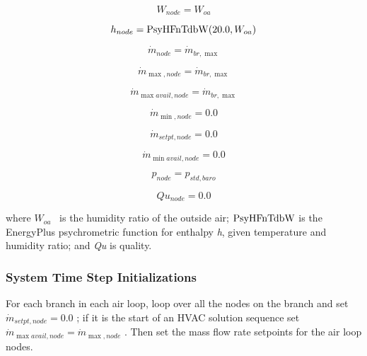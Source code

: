 \begin{equation}
{W_{node}} = {W_{oa}}
\end{equation}

\begin{equation}
{h_{node}} = {\mathop{\rm PsyHFnTdbW}\nolimits} {\rm{(}}20.0,{W_{oa}}{\rm{)}}
\end{equation}

\begin{equation}
{\dot m_{node}} = {\dot m_{br,\max }}
\end{equation}

\begin{equation}
{\dot m_{\max ,node}} = {\dot m_{br,\max }}
\end{equation}

\begin{equation}
{\dot m_{\max avail,node}} = {\dot m_{br,\max }}
\end{equation}

\begin{equation}
{\dot m_{\min ,node}} = 0.0
\end{equation}

\begin{equation}
{\dot m_{setpt,node}} = 0.0
\end{equation}

\begin{equation}
{\dot m_{\min avail,node}} = 0.0
\end{equation}

\begin{equation}
{p_{node}} = {p_{std,baro}}
\end{equation}

\begin{equation}
Q{u_{node}} = 0.0
\end{equation}

where \({W_{oa}}\) ~is the humidity ratio of the outside air; \({\rm{PsyHFnTdbW}}\) is the EnergyPlus psychrometric function for enthalpy \emph{h}, given temperature and humidity ratio; and \emph{Qu} is quality.

\subsubsection{System Time Step Initializations}\label{system-time-step-initializations}

For each branch in each air loop, loop over all the nodes on the branch and set \({\dot m_{setpt,node}} = 0.0\) ; if it is the start of an HVAC solution sequence set \({\dot m_{\max avail,node}} = {\dot m_{\max ,node}}\) . Then set the mass flow rate setpoints for the air loop nodes.

